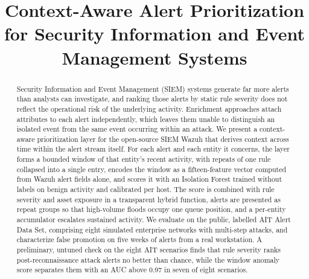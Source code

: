 \documentclass[conference]{IEEEtran}
\begin{document}
\title{Context-Aware Alert Prioritization for Security Information and Event Management Systems}
\author{%
}

\maketitle

\begin{abstract}
Security Information and Event Management (SIEM) systems generate far more alerts than analysts can investigate, and ranking those alerts by static rule severity does not reflect the operational risk of the underlying activity. Enrichment approaches attach attributes to each alert independently, which leaves them unable to distinguish an isolated event from the same event occurring within an attack. We present a context-aware prioritization layer for the open-source SIEM Wazuh that derives context across time within the alert stream itself. For each alert and each entity it concerns, the layer forms a bounded window of that entity's recent activity, with repeats of one rule collapsed into a single entry, encodes the window as a fifteen-feature vector computed from Wazuh alert fields alone, and scores it with an Isolation Forest trained without labels on benign activity and calibrated per host. The score is combined with rule severity and asset exposure in a transparent hybrid function, alerts are presented as repeat groups so that high-volume floods occupy one queue position, and a per-entity accumulator escalates sustained activity. We evaluate on the public, labelled AIT Alert Data Set, comprising eight simulated enterprise networks with multi-step attacks, and characterize false promotion on five weeks of alerts from a real workstation. A preliminary, untuned check on the eight AIT scenarios finds that rule severity ranks post-reconnaissance attack alerts no better than chance, while the window anomaly score separates them with an AUC above 0.97 in seven of eight scenarios.
\end{abstract}
\end{document}

